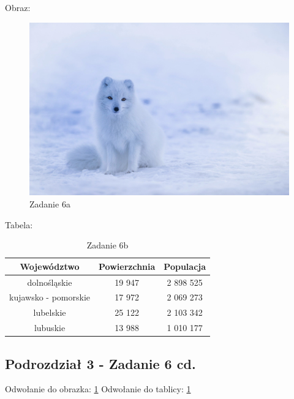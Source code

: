 \documentclass{article}
\begin{document}
Obraz:
\begin{figure}[hbt!]
\centering
\includegraphics[scale=0.15]{lis}
\caption{Zadanie 6a}
\label{Lis}
\end{figure}

Tabela:
\begin{table}[h!]
\caption{Zadanie 6b}
\label{Tabela województw}
\begin{center}
 \begin{tabular}{|c | c | c|}
 \hline
 Województwo & Powierzchnia & Populacja \\ [1ex] 
 \hline
 dolnośląskie & 19 947 & 2 898 525 \\ 
 \hline
 kujawsko - pomorskie & 17 972 & 2 069 273 \\
 \hline
 lubelskie & 25 122 & 2 103 342 \\
 \hline
 lubuskie & 13 988 & 1 010 177 \\
 \hline
\end{tabular}
\end{center}
\end{table}
\subsection{Podrozdział 3 - Zadanie 6 cd.}
Odwołanie do obrazka: \ref{Lis}
Odwołanie do tablicy: \ref{Tabela województw}
\end{document}
